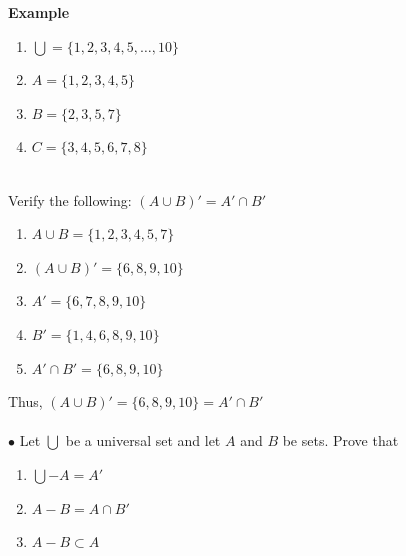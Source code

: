 \documentclass[11pt,a4paper]{article}
\begin{document}
\textbf{Example}
\begin{enumerate}
\item[] $\bigcup = \{1,2,3,4,5,\ldots, 10\}$
\item[] $A = \{1,2,3,4,5\}$
\item[] $B = \{2,3,5,7\}$
\item[] $C = \{3,4,5,6,7,8\}$\\\
\end{enumerate}

Verify the following: $(A\cup B)' = A'\cap B'$
\begin{enumerate}
\item[] $A\cup B = \{1,2,3,4,5,7\}$
\item[] $(A\cup B)' = \{6,8,9,10\}$
\item[] $A' =\{6,7,8,9,10\}$
\item[] $B' = \{1,4, 6, 8, 9, 10\}$
\item[] $A'\cap B' = \{6, 8, 9, 10\}$\\
\end{enumerate}
Thus, $(A\cup B)' =\{6,8,9,10\}=A'\cap B'$\\\\




\pagebreak
$\bullet$ Let $\bigcup$ be a universal set and let $A$ and $B$ be sets. Prove that 
\begin{enumerate}
\item $\bigcup - A=A'$
\item $A-B=A\cap B'$
\item $A-B\subset A$\\\\
\end{enumerate}












\pagebreak
\end{document}
